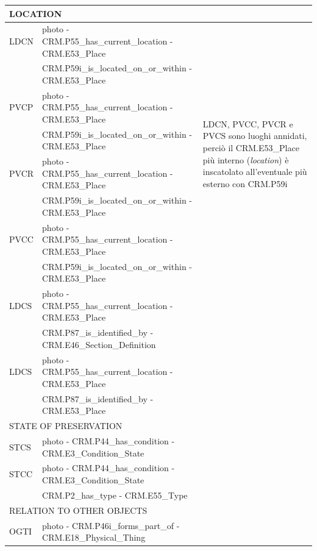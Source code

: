 \begin{center}
\begin{longtable}{ | p{1cm} | p{8cm} | p{3cm} | }
  \multicolumn{3}{|l|}{\cellcolor{lightcyan}LOCATION}\\ \hline
  LDCN &  photo - CRM.P55\_has\_current\_location - CRM.E53\_Place & \multirow{8}{3cm}{LDCN, PVCC, PVCR e PVCS sono luoghi annidati, perciò il CRM.E53\_Place più interno (\emph{location}) è inscatolato all'eventuale più esterno con CRM.P59i}\\
   & CRM.P59i\_is\_located\_on\_or\_within - CRM.E53\_Place & \\ \cline{1-2}
  PVCP &  photo - CRM.P55\_has\_current\_location - CRM.E53\_Place & \\
   & CRM.P59i\_is\_located\_on\_or\_within - CRM.E53\_Place & \\ \cline{1-2}
  PVCR &  photo - CRM.P55\_has\_current\_location - CRM.E53\_Place & \\
   & CRM.P59i\_is\_located\_on\_or\_within - CRM.E53\_Place & \\ \cline{1-2}
  PVCC &  photo - CRM.P55\_has\_current\_location - CRM.E53\_Place & \\
   & CRM.P59i\_is\_located\_on\_or\_within - CRM.E53\_Place & \\ \hline
  LDCS &  photo - CRM.P55\_has\_current\_location - CRM.E53\_Place & \\
   & CRM.P87\_is\_identified\_by - CRM.E46\_Section\_Definition & \\ \hline
  LDCS &  photo - CRM.P55\_has\_current\_location - CRM.E53\_Place & \\
   & CRM.P87\_is\_identified\_by - CRM.E53\_Place & \\ \hline

  \multicolumn{3}{|l|}{\cellcolor{lightcyan}STATE OF PRESERVATION}\\ \hline
  STCS &  photo - CRM.P44\_has\_condition - CRM.E3\_Condition\_State & \\ \hline
  STCC &  photo - CRM.P44\_has\_condition - CRM.E3\_Condition\_State & \\
   & CRM.P2\_has\_type - CRM.E55\_Type & \\ \hline

  \multicolumn{3}{|l|}{\cellcolor{lightcyan}RELATION TO OTHER OBJECTS}\\ \hline
  OGTI &  photo - CRM.P46i\_forms\_part\_of - CRM.E18\_Physical\_Thing & \\ \hline
\end{longtable}
\end{center}


